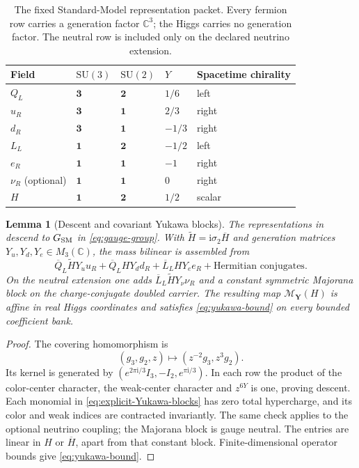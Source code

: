 \documentclass[11pt]{article}
\numberwithin{equation}{section}
\newtheorem{lemma}[lemma]{Lemma}
\theoremstyle{definition}
\theoremstyle{remark}
\newcommand{\C}{\mathbb C}
\newcommand{\ii}{\mathrm i}
\newcommand{\SU}{\mathrm{SU}}
\begin{document}
\begin{table}[htbp]
\centering
\caption{The fixed Standard-Model representation packet.  Every fermion row
carries a generation factor $\C^3$; the Higgs carries no generation factor.
The neutral row is included only on the declared neutrino extension.}
\label{tab:SM-representations}
\begin{tabular}{@{}lllll@{}}
\toprule
Field & $\SU(3)$ & $\SU(2)$ & $Y$ & Spacetime chirality\\
\midrule
$Q_L$ & $\boldsymbol 3$ & $\boldsymbol 2$ & $1/6$ & left\\
$u_R$ & $\boldsymbol 3$ & $\boldsymbol 1$ & $2/3$ & right\\
$d_R$ & $\boldsymbol 3$ & $\boldsymbol 1$ & $-1/3$ & right\\
$L_L$ & $\boldsymbol 1$ & $\boldsymbol 2$ & $-1/2$ & left\\
$e_R$ & $\boldsymbol 1$ & $\boldsymbol 1$ & $-1$ & right\\
$\nu_R$ (optional) & $\boldsymbol 1$ & $\boldsymbol 1$ & $0$ & right\\
$H$ & $\boldsymbol 1$ & $\boldsymbol 2$ & $1/2$ & scalar\\
\bottomrule
\end{tabular}
\end{table}

\begin{lemma}[Descent and covariant Yukawa blocks]
\label{lem:SM-descent}
The representations in  descend to
$G_{\rm SM}$ in \eqref{eq:gauge-group}.  With
$\widetilde H=\ii\sigma_2\overline H$ and generation matrices
$Y_u,Y_d,Y_e\in M_3(\C)$, the mass bilinear is assembled from
\begin{equation}
 \overline Q_L\widetilde H Y_u u_R+
 \overline Q_L H Y_d d_R+\overline L_L H Y_e e_R
 +\text{Hermitian conjugates}.
 \label{eq:explicit-Yukawa-blocks}
\end{equation}
On the neutral extension one adds
$\overline L_L\widetilde H Y_\nu\nu_R$ and a constant symmetric Majorana
block on the charge-conjugate doubled carrier.  The resulting map
$\mathscr M_{\boldsymbol Y}(H)$ is affine in real Higgs coordinates and
satisfies \eqref{eq:yukawa-bound} on every bounded coefficient bank.
\end{lemma}
\begin{proof}
The covering homomorphism is
\[
 (g_3,g_2,z)\longmapsto(z^{-2}g_3,z^3g_2).
\]
Its kernel is generated by
$(e^{2\pi\ii/3}I_3,-I_2,e^{\pi\ii/3})$.
In each row the product of the color-center character, the weak-center
character and $z^{6Y}$ is one, proving descent.  Each monomial in
\eqref{eq:explicit-Yukawa-blocks} has zero total hypercharge, and its color
and weak indices are contracted invariantly.  The same check applies to
the optional neutrino coupling; the Majorana block is gauge neutral.
The entries are linear in $H$ or $\overline H$, apart from that constant
block.  Finite-dimensional operator bounds give \eqref{eq:yukawa-bound}.
\end{proof}
\end{document}
